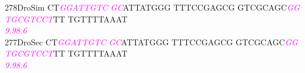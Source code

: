 \documentclass[11pt,twoside,reqno,a4paper]{article}
\begin{document}
{278\hspace*{1\charwidth}DroSim	CT\textit{\textcolor{magenta}{G}}\textit{\textcolor{magenta}{G}}\textit{\textcolor{magenta}{A}}\textit{\textcolor{magenta}{T}}\textit{\textcolor{magenta}{T}}\textit{\textcolor{magenta}{G}}\textit{\textcolor{magenta}{T}}\textit{\textcolor{magenta}{C}}	\textit{\textcolor{magenta}{G}}\textit{\textcolor{magenta}{C}}ATTATGGG	TTTCCGAGCG	GTCGCAGC\textit{\textcolor{magenta}{G}}\textit{\textcolor{magenta}{G}}	\textit{\textcolor{magenta}{T}}\textit{\textcolor{magenta}{G}}\textit{\textcolor{magenta}{C}}\textit{\textcolor{magenta}{G}}\textit{\textcolor{magenta}{T}}\textit{\textcolor{magenta}{C}}\textit{\textcolor{magenta}{C}}\textit{\textcolor{magenta}{T}}TT	TGTTTTAAAT	\\
\hspace*{4\charwidth}\hspace*{7\charwidth}\hspace*{2\charwidth}\textit{\textcolor{magenta}{9.9}}\hspace*{1\charwidth}\hspace*{1\charwidth}\hspace*{1\charwidth}\hspace*{33\charwidth}\textit{\textcolor{magenta}{8.6}}\hspace*{1\charwidth}\hspace*{1\charwidth}\hspace*{1\charwidth}\\
277\hspace*{1\charwidth}DroSec	CT\textit{\textcolor{magenta}{G}}\textit{\textcolor{magenta}{G}}\textit{\textcolor{magenta}{A}}\textit{\textcolor{magenta}{T}}\textit{\textcolor{magenta}{T}}\textit{\textcolor{magenta}{G}}\textit{\textcolor{magenta}{T}}\textit{\textcolor{magenta}{C}}	\textit{\textcolor{magenta}{G}}\textit{\textcolor{magenta}{C}}ATTATGGG	TTTCCGAGCG	GTCGCAGC\textit{\textcolor{magenta}{G}}\textit{\textcolor{magenta}{G}}	\textit{\textcolor{magenta}{T}}\textit{\textcolor{magenta}{G}}\textit{\textcolor{magenta}{C}}\textit{\textcolor{magenta}{G}}\textit{\textcolor{magenta}{T}}\textit{\textcolor{magenta}{C}}\textit{\textcolor{magenta}{C}}\textit{\textcolor{magenta}{T}}TT	TGTTTTAAAT	\\
\hspace*{4\charwidth}\hspace*{7\charwidth}\hspace*{2\charwidth}\textit{\textcolor{magenta}{9.9}}\hspace*{1\charwidth}\hspace*{1\charwidth}\hspace*{1\charwidth}\hspace*{33\charwidth}\textit{\textcolor{magenta}{8.6}}\hspace*{1\charwidth}\hspace*{1\charwidth}\hspace*{1\charwidth}\\
}
\end{document}

